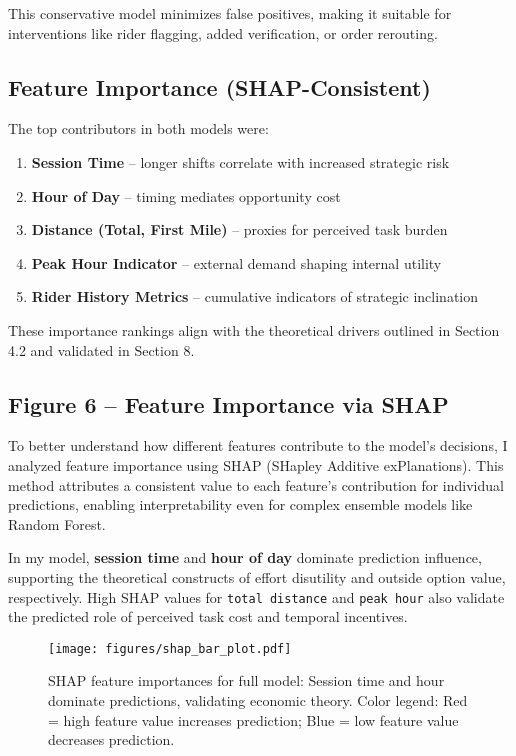 This conservative model minimizes false positives, making it suitable for interventions like rider flagging, added verification, or order rerouting.

\subsection{Feature Importance (SHAP-Consistent)}

The top contributors in both models were:

\begin{enumerate}
    \item \textbf{Session Time} -- longer shifts correlate with increased strategic risk
    \item \textbf{Hour of Day} -- timing mediates opportunity cost
    \item \textbf{Distance (Total, First Mile)} -- proxies for perceived task burden
    \item \textbf{Peak Hour Indicator} -- external demand shaping internal utility
    \item \textbf{Rider History Metrics} -- cumulative indicators of strategic inclination
\end{enumerate}

These importance rankings align with the theoretical drivers outlined in Section 4.2 and validated in Section 8.

\subsection*{Figure 6 -- Feature Importance via SHAP}

To better understand how different features contribute to the model's decisions, I analyzed feature importance using SHAP (SHapley Additive exPlanations). This method attributes a consistent value to each feature's contribution for individual predictions, enabling interpretability even for complex ensemble models like Random Forest.

In my model, \textbf{session time} and \textbf{hour of day} dominate prediction influence, supporting the theoretical constructs of effort disutility and outside option value, respectively. High SHAP values for \texttt{total distance} and \texttt{peak hour} also validate the predicted role of perceived task cost and temporal incentives.

\begin{figure}[H]
\centering
\texttt{[image: figures/shap\_bar\_plot.pdf]}
\caption{SHAP feature importances for full model: Session time and hour dominate predictions, validating economic theory. Color legend: Red = high feature value increases prediction; Blue = low feature value decreases prediction.}
\label{fig:shap_bar}
\end{figure}

